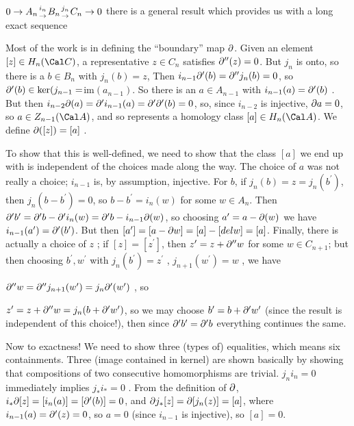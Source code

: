 $0\rightarrow A_n{i_n\atop \rightarrow}B_n{j_n\atop \rightarrow}C_n\rightarrow 0$
\hhsk
there is a general result which provides us with a long exact sequence


Most of the work is in defining the ``boundary'' map $\partial$. Given an 
element $[z]\in H_n({\Cal C})$, a representative $z\in C_n$ satisfies 
$\partial^{\prime\prime}(z)=0$. But $j_n$ is onto, so there is a $b\in B_n$ with
$j_n(b)=z$, Then $ i_{n-1}\partial^\prime(b) = \partial^{\prime\prime}j_n(b)
=0$, so $\partial^\prime(b)\in\ker(j_{n-1}=$im$(a_{n-1})$. So there is an $a\in A_{n-1}$
with $i_{n-1}(a)=\partial^\prime(b)$ . But then 
$i_{n-2}\partial (a) = \partial^\prime i_{n-1}(a)=\partial^\prime\partial^\prime(b)=0$,
so, since $i_{n-2}$ is injective, $\partial a=0$, so $a\in Z_{n-1}({\Cal A})$, and
so represents a homology class $[a]\in H_n({\Cal A})$. We define
$\partial([z])=[a]$ . 


To show that this is well-defined, we need to show that the
class $[a]$ we end up with is independent of the choices made along the 
way. The choice of $a$ was not really a choice; $i_{n-1}$ is, by assumption, 
injective. For $b$, if $j_n(b)=z=j_n(b^\prime)$, then
$j_n(b-b^\prime)=0$, so $b-b^\prime=i_n(w)$ for some $w\in A_n$. Then 
$\partial^\prime b^\prime = \partial^\prime b - \partial^\prime i_n(w) = 
\partial^\prime b - i_{n-1} \partial(w)$, so choosing $a^\prime = a-\partial(w)$ we have
$i_{n-1}(a^\prime)=\partial^\prime(b^\prime)$. But then
$[a^\prime]=[a-\partial w] =[a] -[del w] =[a]$. Finally, there is actually a choice
of $z$ ; if $[z]=[z^\prime]$, then $z^\prime = z+\partial^{\prime\prime}w$
for some $w\in C_{n+1}$; but then choosing $b^\prime,w^\prime$ with 
$j_n(b^\prime)=z^\prime$ , $j_{n+1}(w^\prime)=w$ , we have 

$\partial^{\prime\prime}w=\partial^{\prime\prime}j_{n+1}(w^\prime) = j_n\partial^\prime(w^\prime)$ ,
so 

$z^\prime= z+\partial^{\prime\prime}w= j_n(b+\partial^\prime w^\prime)$, so we may choose
$b^\prime = b+\partial^\prime w^\prime$ (since the result is independent of this choice!),
then since $\partial^\prime b^\prime = \partial^\prime b$ everything continues the same.

\msk

Now to exactness! We need to show three (types of) equalities, which means six
containments. Three (image contained in kernel) 
are shown basically by showing that compositions of
two consecutive homomorphisms are trivial. $j_ni_n=0$ 
immediately implies $j_*i_*=0$ . From the definition of $\partial$,
$i_*\partial[z] = [i_n(a)] = [\partial^\prime(b)] = 0$, and 
$\partial j_*[z] = \partial[j_n(z)] = [a]$, where $i_{n-1}(a)=\partial^\prime(z) = 0$,
so $a=0$ (since $i_{n-1}$ is injective), so $[a]=0$. 

